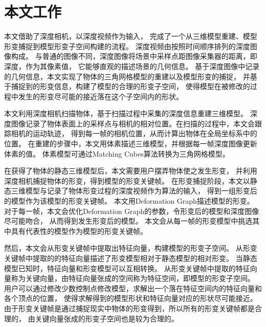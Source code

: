 
\section{本文工作}
本文借助了深度相机，以深度视频作为输入，
完成了一个从三维模型重建、模型形变捕捉到模型形变子空间构建的流程。
深度视频由按照时间顺序排列的深度图像构成。
与普通的图像不同，深度图像将场景中采样点距图像采集器的距离，即深度，作为其像素值，
它能够直观的描述场景的几何信息。
基于深度图像中记录的几何信息，本文实现了物体的三角网格模型的重建以及模型形变的捕捉，
并基于捕捉到的形变信息，构建了模型的合理的形变子空间，
使得模型在被修改的过程中发生的形变尽可能的接近落在这个子空间内的形状。

本文利用深度相机扫描物体，基于扫描过程中采集的深度信息重建三维模型。
深度图像记录了物体表面上的采样点与相机的相对位置。在扫描的过程中，本文会跟踪相机的运动轨迹，
得到每一帧的相机位置，从而计算出物体在全局坐标系中的位置。
在重建的步骤中，本文用体素描述三维模型，并根据每一帧深度图像更新体素的值。
体素模型可通过Matching Cubes\cite{lorensen1987marching}算法转换为三角网格模型。

在获得了物体的静态三维模型后，本文需要用户摆弄物体使之发生形变，
并利用深度相机捕捉物体的形变，得到模型的形变关键帧。
在形变捕捉阶段，本文以静态三维模型与记录了物体形变过程的深度视频作为算法的输入，
得到一组形变后的模型作为该模型的形变关键帧。
本文用Deformation Graph\cite{sumner2007embedded}描述模型的形变。
对于每一帧，本文会优化Deformation Graph的参数，令形变后的模型和深度图像尽可能吻合，
从而得到发生形变后的模型。
本文会从每一帧的形变模型中挑选其中具有代表性的模型作为模型的形变关键帧。

然后，本文会从形变关键帧中提取出特征向量，构建模型的形变子空间。
从形变关键帧中提取的的特征向量描述了形变模型相对于静态模型的相对形变。
当静态模型已知时，特征向量和形变模型可以互相转换。
从形变关键帧中提取的特征向量称为关键向量，由特征向量张成的空间称为特征空间，即模型的形变子空间。
用户可以通过修改少数控制点修改模型，求解出一个落在特征空间内的特征向量和各个顶点的位置，
使得求解得到的模型形状和特征向量对应的形状尽可能接近。
由于形变关键帧是通过捕捉现实中物体的形变得到，所以所有的形变关键帧都是合理的，
由关键向量张成的形变子空间也是较为合理的。